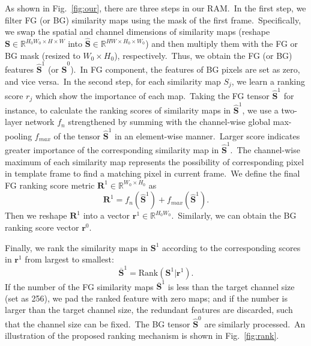 \documentclass[10pt,twocolumn,letterpaper]{article}
\begin{document}
As shown in Fig.~\ref{fig:our}, there are three steps in our RAM.\ In the first step, we filter FG (or BG) similarity maps using the mask of the first frame.\ Specifically, we swap the spatial and channel dimensions of similarity maps (reshape $\mathbf{S}\in\mathbb{R}^{H_0W_0\times H\times W}$ into $\mathbf{\hat{S}}\in\mathbb{R}^{HW\times H_0\times W_0}$) and then multiply them with the FG or BG mask (resized to $W_0\times H_0$), respectively.\ Thus, we obtain the FG (or BG) features $\mathbf{\hat{S}}^1$ (or $\mathbf{\hat{S}}^0$).\ In FG component, the features of BG pixels are set as zero, and vice versa.\ 
In the second step, for each similarity map $S_j$, we learn a ranking score $r_j$ which show the importance of each map.\ Taking the FG tensor $\mathbf{\hat{S}}^1$ for instance, to calculate the ranking scores of similarity maps in $\mathbf{\hat{S}}^1$, we use a two-layer network $f_{n}$ strengthened by summing with the channel-wise global max-pooling $f_{max}$ of the tensor $\mathbf{\hat{S}}^1$ in an element-wise manner.\ Larger score indicates greater importance of the corresponding similarity map in $\mathbf{\hat{S}}^1$.\ The channel-wise maximum of each similarity map represents the possibility of corresponding pixel in template frame to find a matching pixel in current frame.\ We define the final FG ranking score metric $\mathbf{R}^1\in\mathbb{R}^{W_0\times H_0}$ as
\begin{equation}
\mathbf{R}^1=f_{n}(\mathbf{\hat{S}}^1)
+
f_{max}(\mathbf{\hat{S}}^1)
.
\end{equation}
Then we reshape $\mathbf{R}^1$ into a vector $\mathbf{r}^1\in\mathbb{R}^{H_0W_0}$.\ Similarly, we can obtain the BG ranking score vector $\mathbf{r}^0$. 

Finally, we rank the similarity maps in $\mathbf{S}^1$ according to the corresponding scores in $\mathbf{r}^1$ from largest to smallest:
\begin{equation}
\overline{\mathbf{S}}^1=\text{Rank}(\mathbf{S}^1|\mathbf{r}^1)
.
\end{equation}
If the number of the FG similarity maps $\overline{\mathbf{S}}^1$ is less than the target channel size (set as 256), we pad the ranked feature with zero maps; and if the number is larger than the target channel size, the redundant features are discarded, such that the channel size can be fixed.\ The BG tensor $\mathbf{\hat{S}}^0$ are similarly processed.\ An illustration of the proposed ranking mechanism is shown in Fig.~\ref{fig:rank}.\
 
 
\end{document}
